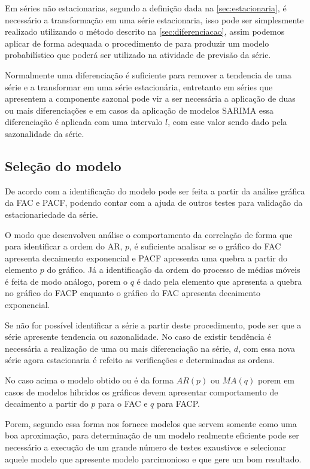 \documentclass[
    12pt,
    oneside,
    a4paper,
    english,
    brazil
]{abntex2}
\begin{document}
Em séries não estacionarias, segundo a definição dada na
\autoref{sec:estacionaria}, é necessário a transformação em uma série
estacionaria, isso pode ser simplesmente realizado utilizando o método descrito
na \autoref{sec:diferenciacao}, assim podemos aplicar de forma adequada o
procedimento de  para produzir um modelo probabilístico que
poderá ser utilizado na atividade de previsão da série.

Normalmente uma diferenciação é suficiente para remover a tendencia de uma
série e a transformar em uma série estacionária, entretanto em séries que
apresentem a componente sazonal pode vir a ser necessária a aplicação de duas
ou mais diferenciações e em casos da aplicação de modelos SARIMA essa
diferenciação é aplicada com uma intervalo $l$, com esse valor sendo dado pela
sazonalidade da série.

\subsection{Seleção do modelo}

De acordo com  a identificação do modelo pode ser feita
a partir da análise gráfica da FAC e PACF, podendo contar com a ajuda de outros
testes para validação da estacionariedade da série.

O modo que  desenvolveu análise o comportamento da correlação
de forma que para identificar a ordem do AR, $p$, é suficiente analisar se o
gráfico do FAC apresenta decaimento exponencial e PACF apresenta uma quebra a
partir do elemento $p$ do gráfico. Já a identificação da ordem do processo de
médias móveis é feita de modo análogo, porem o $q$ é dado pela elemento que
apresenta a quebra no gráfico do FACP enquanto o gráfico do FAC apresenta
decaimento exponencial.

Se não for possível identificar a série a partir deste procedimento, pode ser
que a série apresente tendencia ou sazonalidade. No caso de existir tendência é
necessária a realização de uma ou mais diferenciação na série, $d$, com essa nova
série agora estacionaria é refeito as verificações e determinadas as ordens.

No caso acima o modelo obtido ou é da forma $AR(p)$ ou $MA(q)$ porem em casos
de modelos hibridos os gráficos devem apresentar comportamento de decaimento a
partir do $p$ para o FAC e $q$ para FACP\@.

Porem, segundo  essa forma nos fornece modelos que servem
somente como uma boa aproximação, para determinação de um modelo realmente
eficiente pode ser necessário a execução de um grande número de testes
exaustivos e selecionar aquele modelo que apresente modelo parcimonioso e que
gere um bom resultado.
\end{document}
